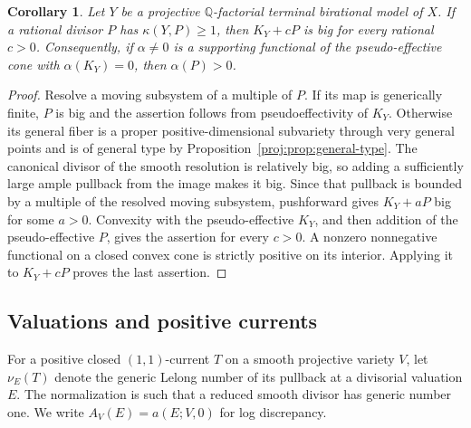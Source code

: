 \documentclass[11pt,letterpaper]{article}
\newtheorem{corollary}[theorem]{Corollary}
\theoremstyle{definition}
\theoremstyle{remark}
\begin{document}
\begin{corollary}\label{proj:ex:supporting}
Let \(Y\) be a projective \(\mathbb{Q}\)-factorial terminal birational model
of \(X\). If a rational divisor \(P\) has \(\kappa(Y,P)\geq1\),
then \(K_Y+cP\) is big for every rational \(c>0\).
Consequently, if \(\alpha\neq0\) is a supporting functional of the
pseudo-effective cone with \(\alpha(K_Y)=0\), then
\(\alpha(P)>0\).
\end{corollary}
\begin{proof}
Resolve a moving subsystem of a multiple of \(P\). If its map is
generically finite, \(P\) is big and the assertion follows from
pseudoeffectivity of \(K_Y\). Otherwise its general fiber is a
proper positive-dimensional subvariety through very general
points and is of general type by Proposition~\ref{proj:prop:general-type}.
The canonical divisor of the smooth resolution is relatively big,
so adding a sufficiently large ample pullback from the image makes
it big. Since that pullback is bounded by a multiple of the
resolved moving subsystem, pushforward gives \(K_Y+aP\) big for
some \(a>0\). Convexity with the pseudo-effective \(K_Y\), and then
addition of the pseudo-effective \(P\), gives the assertion for
every \(c>0\). A nonzero nonnegative functional on a closed convex
cone is strictly positive on its interior. Applying it to
\(K_Y+cP\) proves the last assertion.
\end{proof}

\subsection{Valuations and positive currents}

For a positive closed \((1,1)\)-current \(T\) on a smooth projective
variety \(V\), let \(\nu_E(T)\) denote the generic Lelong number of
its pullback at a divisorial valuation \(E\). The normalization is
such that a reduced smooth divisor has generic number one. We
write \(A_V(E)=a(E;V,0)\) for log discrepancy.
\end{document}
